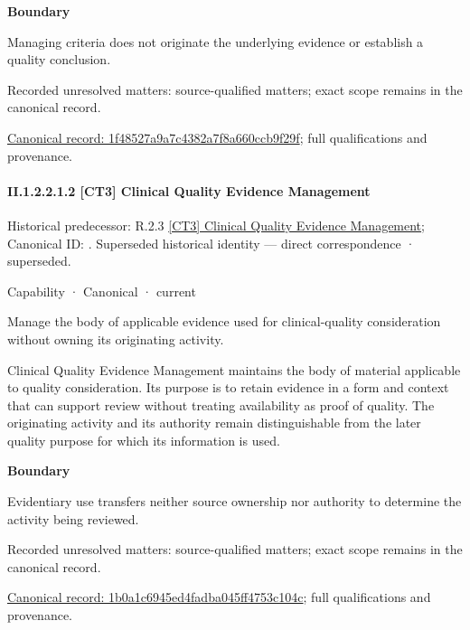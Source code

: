 \textbf{Boundary}



Managing criteria does not originate the underlying evidence or establish a quality conclusion.


{\small Recorded unresolved matters: source-qualified matters; exact scope remains in the canonical record.}\par
{\footnotesize \href{../../../../../../../continuum/strategy/capability/1f48527a9a7c4382a7f8a660ccb9f29f.md}{Canonical record: 1f48527a9a7c4382a7f8a660ccb9f29f}; full qualifications and provenance.}\par
\paragraph*{II.1.2.2.1.2 [CT3] Clinical Quality Evidence Management}
\label{navigation:II.1.2.2.1.2}

{\small Historical predecessor: R.2.3 \hyperref[element:f31902d474894670aeef3e0abbedccf0]{[CT3] Clinical Quality Evidence Management}; Canonical ID: \texttt{}. Superseded historical identity — direct correspondence · superseded.}\par
\label{element:1b0a1c6945ed4fadba045ff4753c104c}
{\small Capability · Canonical · current}\par

Manage the body of applicable evidence used for clinical-quality consideration without owning its originating activity.



Clinical Quality Evidence Management maintains the body of material applicable to quality consideration. Its purpose is to retain evidence in a form and context that can support review without treating availability as proof of quality. The originating activity and its authority remain distinguishable from the later quality purpose for which its information is used.



\textbf{Boundary}



Evidentiary use transfers neither source ownership nor authority to determine the activity being reviewed.


{\small Recorded unresolved matters: source-qualified matters; exact scope remains in the canonical record.}\par
{\footnotesize \href{../../../../../../../continuum/strategy/capability/1b0a1c6945ed4fadba045ff4753c104c.md}{Canonical record: 1b0a1c6945ed4fadba045ff4753c104c}; full qualifications and provenance.}\par
